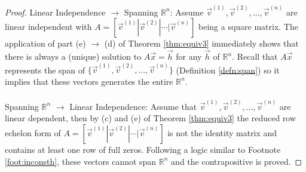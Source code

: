 \begin{proof}
Linear Independence $\rightarrow$ Spanning $\mathbb{R}^n$: Assume $\vec{v}^{(1)}, \vec{v}^{(2)}, \ldots, \vec{v}^{(n)}$ are linear independent with $A = [\vec{v}^{(1)}|\vec{v}^{(2)}|\cdots|\vec{v}^{(n)}]$ being a square matrix. The application of part (e) $\rightarrow$ (d) of Theorem \ref{thm:equiv3} immediately shows that there is always a (unique) solution to $A\vec{x} = \vec{h}$ for any $\vec{h}$ of $\mathbb{R}^n$. Recall that $A\vec{x}$ represents the span of $\{\vec{v}^{(1)}, \vec{v}^{(2)}, \ldots, \vec{v}^{(n)}\}$ (Definition \ref{defn:span}) so it implies that these vectors generates the entire $\mathbb{R}^n$.\\
\\
Spanning $\mathbb{R}^n$ $\rightarrow$ Linear Independence: Assume that $\vec{v}^{(1)}, \vec{v}^{(2)}, \ldots, \vec{v}^{(n)}$ are linear dependent, then by (c) and (e) of Theorem \ref{thm:equiv3} the reduced row echelon form of $A = [\vec{v}^{(1)}|\vec{v}^{(2)}|\cdots|\vec{v}^{(n)}]$ is not the identity matrix and contains at least one row of full zeros. Following a logic similar to Footnote \ref{foot:inconsth}, these vectors cannot span $\mathbb{R}^n$ and the contrapositive is proved. 
\end{proof}

